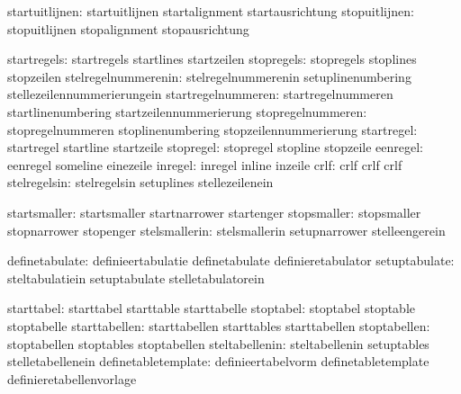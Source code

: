                startuitlijnen:  startuitlijnen               startalignment
                                startausrichtung
                stopuitlijnen:  stopuitlijnen                stopalignment
                                stopausrichtung

                  startregels:  startregels                  startlines
                                startzeilen
                   stopregels:  stopregels                   stoplines
                                stopzeilen
          stelregelnummerenin:  stelregelnummerenin          setuplinenumbering
                                stellezeilennummerierungein
           startregelnummeren:  startregelnummeren           startlinenumbering
                                startzeilennummerierung
            stopregelnummeren:  stopregelnummeren            stoplinenumbering
                                stopzeilennummerierung
                   startregel:  startregel                   startline
                                startzeile
                    stopregel:  stopregel                    stopline
                                stopzeile
                     eenregel:  eenregel                     someline
                                einezeile
                      inregel:  inregel                      inline
                                inzeile
                         crlf:  crlf                         crlf
                                crlf
                 stelregelsin:  stelregelsin                 setuplines
                                stellezeilenein

                 startsmaller:  startsmaller                 startnarrower
                                startenger
                  stopsmaller:  stopsmaller                  stopnarrower
                                stopenger
                stelsmallerin:  stelsmallerin                setupnarrower
                                stelleengerein

               definetabulate:  definieertabulatie           definetabulate
                                definieretabulator
                setuptabulate:  steltabulatiein              setuptabulate
                                stelletabulatorein

                   starttabel:  starttabel                   starttable
                                starttabelle
                    stoptabel:  stoptabel                    stoptable
                                stoptabelle
                starttabellen:  starttabellen                starttables
                                starttabellen
                 stoptabellen:  stoptabellen                 stoptables
                                stoptabellen
               steltabellenin:  steltabellenin               setuptables
                                stelletabellenein
          definetabletemplate:  definieertabelvorm           definetabletemplate
                                definieretabellenvorlage %

